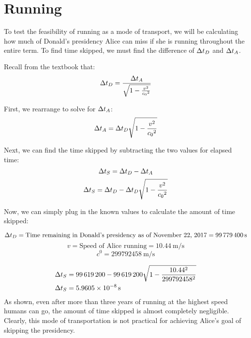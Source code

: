 \section{Running}
	To test the feasibility of running as a mode of transport, we will be calculating how much of Donald's presidency Alice can miss if she is running throughout the entire term. To find time skipped, we must find the difference of $\mathrm{\Delta} t_D$ and $\mathrm{\Delta} t_A$.

	Recall from the textbook \autocite{textbook} that:
	\[\Del t_D = \frac{\Del t_A}{\sqrt{1 - \frac{v^2}{\si{\clight}^2}}}\]

	First, we rearrange to solve for $\mathrm{\Delta} t_A$:
	\[\Del t_A = \Del t_D \sqrt{1 - \frac{v^2}{\si{\clight}^2}}\]

	Next, we can find the time skipped by subtracting the two values for elapsed time:
	\[\mathrm{\Delta} t_S = \mathrm{\Delta} t_D - \mathrm{\Delta} t_A\]
	\[\Del t_S = \Del t_D - \Del t_D\sqrt{1 - \frac{v^2}{\si{\clight}^2}}\]

	Now, we can simply plug in the known values to calculate the amount of time skipped:

	\[\mathrm{\Delta} t_D = \text{Time remaining in Donald's presidency as of November 22, 2017} = \SI{99779400}{\second}\]
	\[v = \text{Speed of Alice running} = \SI{10.44}{\metre/\second}\]
	\[\si{\clight} = \SI{299792458}{\metre/\second}\]

	\begin{align*}
		\mathrm{\Delta} t_S &= \num{99619200} - \num{99619200} \sqrt {1- \frac{10.44^2}{299792458^2}}\\
		\mathrm{\Delta} t_S &= \SI{5.9605e-8}{\second}
	\end{align*}
	As shown, even after more than three years of running at the highest speed humans can go, the amount of time skipped is almost completely negligible. Clearly, this mode of transportation is not practical for achieving Alice's goal of skipping the presidency.
